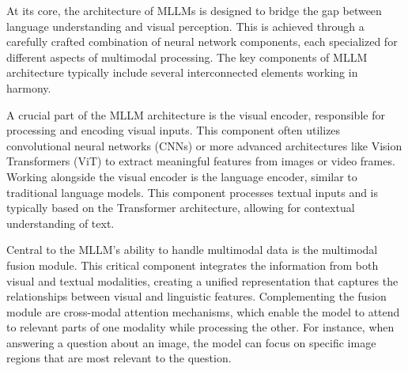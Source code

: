 At its core, the architecture of MLLMs is designed to bridge the gap between language understanding and visual perception. This is achieved through a carefully crafted combination of neural network components, each specialized for different aspects of multimodal processing. The key components of MLLM architecture typically include several interconnected elements working in harmony.

A crucial part of the MLLM architecture is the visual encoder, responsible for processing and encoding visual inputs. This component often utilizes convolutional neural networks (CNNs) or more advanced architectures like Vision Transformers (ViT) to extract meaningful features from images or video frames. Working alongside the visual encoder is the language encoder, similar to traditional language models. This component processes textual inputs and is typically based on the Transformer architecture, allowing for contextual understanding of text.

Central to the MLLM's ability to handle multimodal data is the multimodal fusion module. This critical component integrates the information from both visual and textual modalities, creating a unified representation that captures the relationships between visual and linguistic features. Complementing the fusion module are cross-modal attention mechanisms, which enable the model to attend to relevant parts of one modality while processing the other. For instance, when answering a question about an image, the model can focus on specific image regions that are most relevant to the question.

